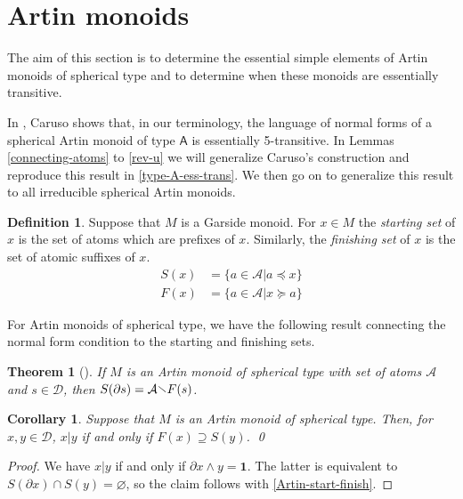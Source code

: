 \documentclass[a4paper,final]{article}
\let\emptyset\varnothing
\theoremstyle{plain}
\newtheorem{theorem}{Theorem}
\newtheorem{corollary}[corollary]{Corollary}
\theoremstyle{remark}
\theoremstyle{definition}
\newtheorem{definition}[definition]{Definition}
\begin{document}
{}

\section{Artin monoids}\label{S:ArtinMonoids}

The aim of this section is to determine the essential simple elements
of Artin monoids of spherical type and to determine when these monoids
are essentially transitive.

In \cite[Lemma~3.4]{Caruso13}, Caruso shows that, in our terminology,
the language of normal forms of a spherical Artin monoid of type
${\mathsf{{A}}}$ is essentially 5-transitive.  In Lemmas
\ref{connecting-atoms} to \ref{rev-u} we will generalize Caruso's
construction and reproduce this result in \autoref{type-A-ess-trans}.
We then go on to generalize this result to all irreducible spherical
Artin monoids.

{}

\begin{definition}
  Suppose that $M$ is a Garside monoid.  For $x \in M$ the
  \emph{starting set} of $x$ is the set of atoms which are prefixes of
  $x$.  Similarly, the \emph{finishing set} of $x$ is the set of
  atomic suffixes of $x$.
  \begin{align*}
    {S}(x) &= \{ a \in {\mathcal{A}} | a {\preccurlyeq} x \} \\
    {F}(x) &= \{ a \in {\mathcal{A}} | x {\succcurlyeq} a \}
  \end{align*}
\end{definition}

For Artin monoids of spherical type, we have the following result connecting
the normal form condition to the starting and finishing sets.

\begin{theorem}[{\cite[Lemma 4.2]{Charney1993}}]\label{Artin-start-finish}
 If $M$ is an Artin monoid of spherical type with set of atoms ${\mathcal{A}}$ and $s\in{\mathcal{D}}$, then ${S}({\partial} s) = {\mathcal{A}}{\mathbin{\raisebox{0.25ex}{$\smallsetminus$}}}{F}(s)$.
\end{theorem}

\begin{corollary}\label{Artin-normal-form}
  Suppose that $M$ is an Artin monoid of spherical type.  Then, for $x, y \in
  {\mathcal{D}}$, $x | y$ if and only if ${F}(x) \supseteq {S}(y)$. \qed
\end{corollary}
\begin{proof}
We have $x|y$ if and only if ${\partial} x {\wedge} y = {\mathbf{1}}$.  The latter is equivalent to ${S}(\partial x){\cap} {S}(y)=\emptyset$, so the claim follows with \autoref{Artin-start-finish}.
\end{proof}
\end{document}

